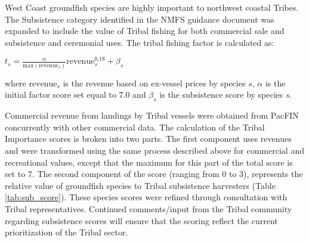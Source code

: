 \documentclass[12pt,]{article}
\begin{document}
West Coast groundfish species are highly important to northwest coastal
Tribes. The Subsistence category identified in the NMFS guidance
document was expanded to include the value of Tribal fishing for both
commercial sale and subsistence and ceremonial uses. The tribal fishing
factor is calculated as:

\begin{centering}

$t_{s} = \frac{\alpha}{\text{max}(\text{revenue}_{s})} \text{revenue}_{s}^{0.18} + \beta_s$
    
    \end{centering}

where \(\text{revenue}_s\) is the revenue based on ex-vessel prices by
species \(s\), \(\alpha\) is the initial factor score set equal to 7.0
and \(\beta_s\) is the subsistence score by species \(s\).

Commercial revenue from landings by Tribal vessels were obtained from
PacFIN concurrently with other commercial data. The calculation of the
Tribal Importance scores is broken into two parts. The first component
uses revenues and were transformed using the same process described
above for commercial and recreational values, except that the maximum
for this part of the total score is set to 7. The second component of
the score (ranging from 0 to 3), represents the relative value of
groundfish species to Tribal subsistence harvesters (Table
\ref{tab:sub_score}). These species scores were refined through
consultation with Tribal representatives. Continued comments/input from
the Tribal community regarding subsistence scores will ensure that the
scoring reflect the current prioritization of the Tribal sector.
\end{document}
